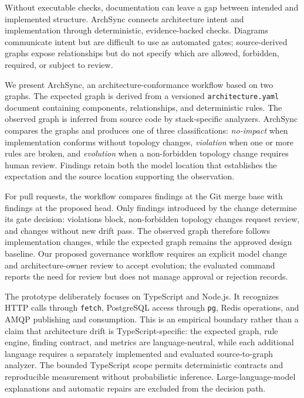 \documentclass[conference]{IEEEtran}
\begin{document}
Without executable checks, documentation can leave a gap between intended and implemented structure. ArchSync connects architecture intent and implementation through deterministic, evidence-backed checks. Diagrams communicate intent but are difficult to use as automated gates; source-derived graphs expose relationships but do not specify which are allowed, forbidden, required, or subject to review.

We present ArchSync, an architecture-conformance workflow based on two graphs. The expected graph is derived from a versioned \texttt{architecture.yaml} document containing components, relationships, and deterministic rules. The observed graph is inferred from source code by stack-specific analyzers. ArchSync compares the graphs and produces one of three classifications: \emph{no-impact} when implementation conforms without topology changes, \emph{violation} when one or more rules are broken, and \emph{evolution} when a non-forbidden topology change requires human review. Findings retain both the model location that establishes the expectation and the source location supporting the observation.

For pull requests, the workflow compares findings at the Git merge base with findings at the proposed head. Only findings introduced by the change determine its gate decision: violations block, non-forbidden topology changes request review, and changes without new drift pass. The observed graph therefore follows implementation changes, while the expected graph remains the approved design baseline. Our proposed governance workflow requires an explicit model change and architecture-owner review to accept evolution; the evaluated command reports the need for review but does not manage approval or rejection records.

The prototype deliberately focuses on TypeScript and Node.js. It recognizes HTTP calls through \texttt{fetch}, PostgreSQL access through \texttt{pg}, Redis operations, and AMQP publishing and consumption. This is an empirical boundary rather than a claim that architecture drift is TypeScript-specific: the expected graph, rule engine, finding contract, and metrics are language-neutral, while each additional language requires a separately implemented and evaluated source-to-graph analyzer. The bounded TypeScript scope permits deterministic contracts and reproducible measurement without probabilistic inference. Large-language-model explanations and automatic repairs are excluded from the decision path.
\end{document}
